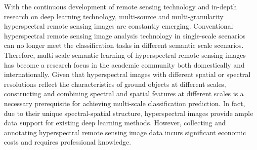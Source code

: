 \begin{eabstract}
	With the continuous development of remote sensing technology and in-depth research on deep learning technology, multi-source and multi-granularity
	hyperspectral remote sensing images are constantly emerging. Conventional hyperspectral remote sensing image analysis technology in single-scale 
	scenarios can no longer meet the classification tasks in different semantic scale scenarios. Therefore, multi-scale semantic learning of hyperspectral 
	remote sensing images has become a research focus in the academic community both domestically and internationally. Given that hyperspectral images 
	with different spatial or spectral resolutions reflect the characteristics of ground objects at different scales, constructing and combining spectral 
	and spatial features at different scales is a necessary prerequisite for achieving multi-scale classification prediction. In fact, due to their 
	unique spectral-spatial structure, hyperspectral images provide ample data support for existing deep learning methods. However, collecting and
	annotating hyperspectral remote sensing image data incurs significant economic costs and requires professional knowledge.
\end{eabstract}
